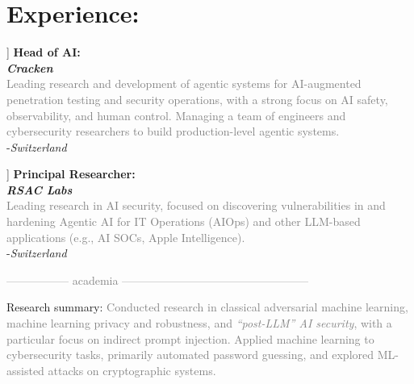 \documentclass[10pt]{article} %
\begin{document}
 
 





\section*{Experience:} 

\begin{description}
	
\item[[ {02/2026 - Now}]] \textbf{Head of AI}\textbf{:}\\
 \textbf{\textit{Cracken}}\\
 \textcolor{gray}{ \textcolor{gray}{Leading research and development of agentic systems for AI-augmented penetration testing and security operations, with a strong focus on AI safety, observability, and human control. Managing a team of engineers and cybersecurity researchers to build production-level agentic systems.}}\\
 -\textit{Switzerland}

\item[[ {11/2024 - 01/2026}]] \textbf{Principal Researcher}\textbf{:}\\
 \textbf{\textit{RSAC Labs}}\\
\textcolor{gray}{\textcolor{gray}{Leading research in AI security, focused on discovering vulnerabilities in and hardening Agentic AI for IT Operations (AIOps) and other LLM-based applications (e.g., AI SOCs, Apple Intelligence).}}\\
 -\textit{Switzerland}

\item \textcolor{gray}{----------------- academia --------------------------------------------------}
\item Research summary: \textcolor{gray}{Conducted research in classical adversarial machine learning, machine learning privacy and robustness, and \textit{``post-LLM'' AI security}, with a particular focus on indirect prompt injection. Applied machine learning to cybersecurity tasks, primarily automated password guessing, and explored ML-assisted attacks on cryptographic systems.}


\end{description}
\end{document}
